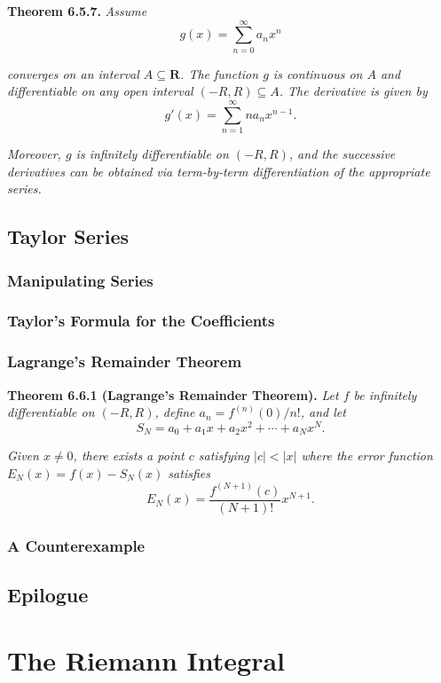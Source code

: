 \documentclass[12pt]{report}
\newcommand{\R}{\textbf{R}}
\begin{document}
\noindent \textbf{Theorem 6.5.7.} \textit{Assume}
\[g(x)=\sum_{n=0}^\infty a_nx^n\]

\noindent \textit{converges on an interval $A\subseteq\R$.  The function $g$ is continuous on $A$ and differentiable on any open interval $(-R,R)\subseteq A$.  The derivative is given by}
\[g'(x)=\sum_{n=1}^\infty na_nx^{n-1}.\]

\noindent \textit{Moreover, $g$ is infinitely differentiable on $(-R,R)$, and the successive derivatives can be obtained via term-by-term differentiation of the appropriate series.}
\bigskip

\section{Taylor Series}

\subsection*{Manipulating Series}

\subsection*{Taylor's Formula for the Coefficients}

\subsection*{Lagrange's Remainder Theorem}

\noindent \textbf{Theorem 6.6.1 (Lagrange's Remainder Theorem).} \textit{Let $f$ be infinitely differentiable on $(-R,R)$, define $a_n=f^{(n)}(0)/n!$, and let}
\[S_N=a_0+a_1x+a_2x^2+\cdots+a_Nx^N.\]

\noindent \textit{Given $x\neq 0$, there exists a point $c$ satisfying $|c|<|x|$ where the error function $E_N(x)=f(x)-S_N(x)$ satisfies}
\[E_N(x)=\frac{f^{(N+1)}(c)}{(N+1)!}x^{N+1}.\]
\bigskip

\subsection*{A Counterexample}

\section{Epilogue}

\chapter{The Riemann Integral}
\end{document}
